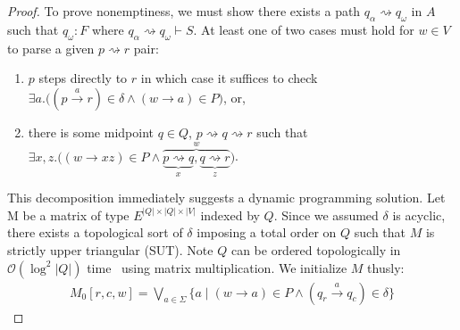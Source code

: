 \documentclass[sigplan,review,acmsmall,nonacm,screen,anonymous]{acmart}\settopmatter{printfolios=false,printccs=false,printacmref=false}
\begin{document}
\begin{proof}[Proof]
  To prove nonemptiness, we must show there exists a path $q_\alpha \rightsquigarrow q_\omega$ in $A$ such that $q_\omega: F$ where $q_\alpha \rightsquigarrow q_\omega \vdash S$. At least one of two cases must hold for $w \in V$ to parse a given $p \rightsquigarrow r$ pair:

  \begin{enumerate}
    \item $p$ steps directly to $r$ in which case it suffices to check $\exists a.\big((p \overset{a}{\rightarrow} r)\in \delta \land (w \rightarrow a) \in P\big)$, or,
    \item there is some midpoint $q \in Q$, $p \rightsquigarrow q \rightsquigarrow r$ such that $\exists x, z.\big((w \rightarrow xz) \in P\land\overbrace{\underbrace{p \rightsquigarrow q}_x, \underbrace{q \rightsquigarrow r}_z}^w\big)$.
  \end{enumerate}

  \noindent This decomposition immediately suggests a dynamic programming solution. Let M be a matrix of type $E^{|Q|\times|Q|\times|V|}$ indexed by $Q$. Since we assumed $\delta$ is acyclic, there exists a topological sort of $\delta$ imposing a total order on $Q$ such that $M$ is strictly upper triangular (SUT). Note $Q$ can be ordered topologically in $\mathcal{O}(\log^2 |Q|)$ time~\cite{dekel1981parallel} using matrix multiplication. We initialize $M$ thusly:
  \begin{align}
    M_0[r, c, w] = \bigvee_{a\in\Sigma} \big\{a \mid (w \rightarrow a) \in P \land (q_r \overset{a}{\rightarrow} q_c)\in \delta\big\}
  \end{align}


\end{proof}
\end{document}
